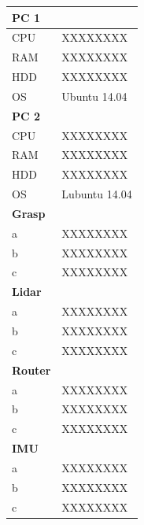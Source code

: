 \begin{figure}[htbp]
\begin{minipage}{0.45\textwidth}
			\begin{tabular}{ | p{2cm} | p{3cm} | }
				\hline
				\bfseries{PC 1} &  \\
				\hline
				CPU & XXXXXXXX \\
				RAM & XXXXXXXX \\
				HDD & XXXXXXXX \\
				OS & Ubuntu 14.04 \\
				\hline \hline
				\bfseries{PC 2} &  \\
				\hline
				CPU & XXXXXXXX \\
				RAM & XXXXXXXX \\
				HDD & XXXXXXXX \\
				OS & Lubuntu 14.04 \\
				\hline \hline
				\bfseries{Grasp} &  \\
				\hline
				a & XXXXXXXX \\
				b & XXXXXXXX \\
				c & XXXXXXXX \\
				\hline \hline
				\bfseries{Lidar} &  \\
				\hline
				a & XXXXXXXX \\
				b & XXXXXXXX \\
				c & XXXXXXXX \\
				\hline \hline
				\bfseries{Router} &  \\
				\hline
				a & XXXXXXXX \\
				b & XXXXXXXX \\
				c & XXXXXXXX \\
				\hline \hline
				\bfseries{IMU} &  \\
				\hline
				a & XXXXXXXX \\
				b & XXXXXXXX \\
				c & XXXXXXXX \\
				\hline
			\end{tabular}
			\label{tab:hw}
	\end{minipage}
\end{figure}

\setcounter{figure}{1}

